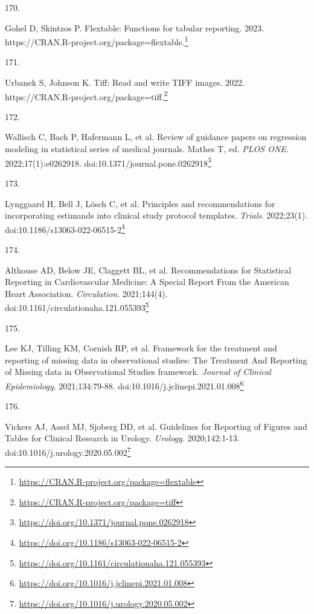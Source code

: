 \documentclass[
]{book}
\newlength{\cslhangindent}
\newlength{\csllabelwidth}
\newlength{\cslentryspacingunit} %
\newenvironment{CSLReferences}[2] %
 {%
  \setlength{\parindent}{0pt}
  \ifodd #1
  \let\oldpar\par
  \def\par{\hangindent=\cslhangindent\oldpar}
  \fi
  \setlength{\parskip}{#2\cslentryspacingunit}
 }%
 {}
\newcommand{\CSLLeftMargin}[1]{\parbox[t]{\csllabelwidth}{#1}}
\newcommand{\CSLRightInline}[1]{\parbox[t]{\linewidth - \csllabelwidth}{#1}\break}
\renewcommand{\href}[2]{#2\footnote{\url{#1}}}
\begin{document}
\begin{CSLReferences}{0}{0}
\leavevmode{}%
\CSLLeftMargin{170. }%
\CSLRightInline{Gohel D, Skintzos P. Flextable: Functions for tabular reporting. 2023. \href{https://CRAN.R-project.org/package=flextable}{https://CRAN.R-project.org/package=flextable.}}

\leavevmode{}%
\CSLLeftMargin{171. }%
\CSLRightInline{Urbanek S, Johnson K. Tiff: Read and write TIFF images. 2022. \href{https://CRAN.R-project.org/package=tiff}{https://CRAN.R-project.org/package=tiff.}}

\leavevmode{}%
\CSLLeftMargin{172. }%
\CSLRightInline{Wallisch C, Bach P, Hafermann L, et al. Review of guidance papers on regression modeling in statistical series of medical journals. Mathes T, ed. \emph{PLOS ONE}. 2022;17(1):e0262918. doi:\href{https://doi.org/10.1371/journal.pone.0262918}{10.1371/journal.pone.0262918}}

\leavevmode{}%
\CSLLeftMargin{173. }%
\CSLRightInline{Lynggaard H, Bell J, Lösch C, et al. Principles and recommendations for incorporating estimands into clinical study protocol templates. \emph{Trials}. 2022;23(1). doi:\href{https://doi.org/10.1186/s13063-022-06515-2}{10.1186/s13063-022-06515-2}}

\leavevmode{}%
\CSLLeftMargin{174. }%
\CSLRightInline{Althouse AD, Below JE, Claggett BL, et al. Recommendations for Statistical Reporting in Cardiovascular Medicine: A Special Report From the American Heart Association. \emph{Circulation}. 2021;144(4). doi:\href{https://doi.org/10.1161/circulationaha.121.055393}{10.1161/circulationaha.121.055393}}

\leavevmode{}%
\CSLLeftMargin{175. }%
\CSLRightInline{Lee KJ, Tilling KM, Cornish RP, et al. Framework for the treatment and reporting of missing data in observational studies: The Treatment And Reporting of Missing data in Observational Studies framework. \emph{Journal of Clinical Epidemiology}. 2021;134:79-88. doi:\href{https://doi.org/10.1016/j.jclinepi.2021.01.008}{10.1016/j.jclinepi.2021.01.008}}

\leavevmode{}%
\CSLLeftMargin{176. }%
\CSLRightInline{Vickers AJ, Assel MJ, Sjoberg DD, et al. Guidelines for Reporting of Figures and Tables for Clinical Research in Urology. \emph{Urology}. 2020;142:1-13. doi:\href{https://doi.org/10.1016/j.urology.2020.05.002}{10.1016/j.urology.2020.05.002}}


\end{CSLReferences}
\end{document}

